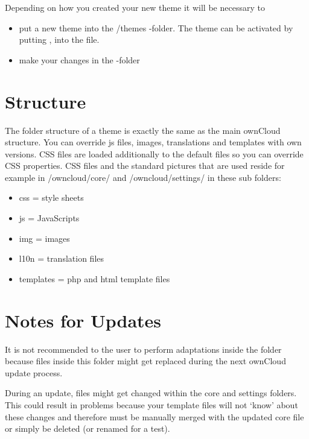 \documentclass[letterpaper,10pt,english]{sphinxmanual}
\begin{document}
Depending on how you created your new theme it will be necessary to
\begin{itemize}
\item {} 
put a new theme into the /themes -folder. The theme can be activated by putting , into the  file.

\item {} 
make your changes in the  -folder

\end{itemize}


\section{Structure}
\label{core/theming:structure}
The folder structure of a theme is exactly the same as the main ownCloud
structure. You can override js files, images, translations and templates with
own versions. CSS files are loaded additionally to the default files so you can
override CSS properties. CSS files and the standard pictures that are used reside
for example in /owncloud/core/ and /owncloud/settings/ in these sub folders:
\begin{itemize}
\item {} 
css = style sheets

\item {} 
js = JavaScripts

\item {} 
img = images

\item {} 
l10n = translation files

\item {} 
templates = php and html template files

\end{itemize}


\section{Notes for Updates}
\label{core/theming:notes-for-updates}\label{core/theming:id1}
It is not recommended to the user to perform adaptations inside the
folder  because files inside this folder might get
replaced during the next ownCloud update process.

During an update, files might get changed within the core and settings
folders. This could result in problems because your template files will
not `know' about these changes and therefore must be manually merged with
the updated core file or simply be deleted (or renamed for a test).
\end{document}
